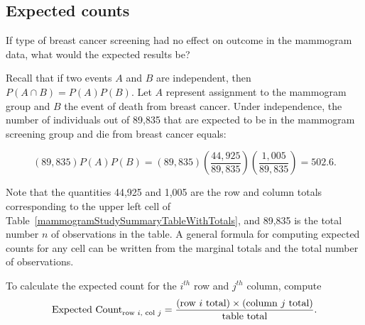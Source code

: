 \subsection{Expected counts}

If type of breast cancer screening had no effect on outcome in the mammogram data, what would the expected results be? 

Recall that if two events $A$ and $B$ are independent, then $P(A \cap B) = P(A)P(B)$. Let $A$ represent assignment to the mammogram group and $B$ the event of death from breast cancer. Under independence, the number of individuals out of 89,835 that are expected to be in the mammogram screening group and die from breast cancer equals:

\[(89,835) P(A)P(B) = (89,835) \left(\frac{44,925}{89,835}\right) \left(\frac{1,005}{89,835} \right) = 502.6. \]

Note that the quantities 44,925 and 1,005 are the row and column totals corresponding to the upper left cell of Table~\ref{mammogramStudySummaryTableWithTotals}, and 89,835 is the total number $n$ of observations in the table. A general formula for computing expected counts for any cell can be written from the marginal totals and the total number of observations.

\begin{termBox}{
		To calculate the expected count for the $i^{th}$ row and $j^{th}$ column, compute
		$$\text{Expected Count}_{\text{row }i,\text{ col }j} = \frac{(\text{row $i$ total}) \times  (\text{column $j$ total})}{\text{table total}}.\vspace{2mm}$$}
\end{termBox}	
	
